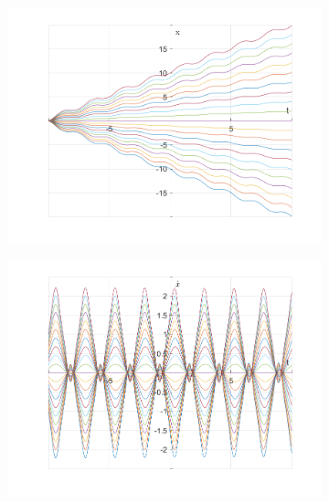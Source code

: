 \documentclass{article}
\begin{document}
	\begin{figure}[h!]
		\centering
		\begin{subfigure}[b]{0.48\linewidth}
			\includegraphics[width=\linewidth]{./SmallOscillations/S4/F3.png}
		\end{subfigure}
		\begin{subfigure}[b]{0.48\linewidth}
			\includegraphics[width=\linewidth]{./SmallOscillations/S4/F4.png}
		\end{subfigure}
	\end{figure}
\end{document}
